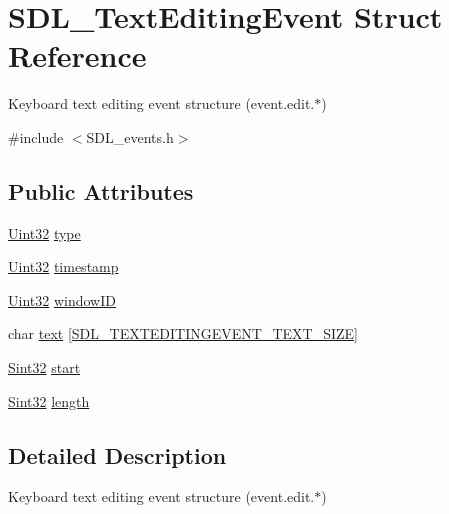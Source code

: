 \hypertarget{struct_s_d_l___text_editing_event}{\section{S\-D\-L\-\_\-\-Text\-Editing\-Event Struct Reference}
\label{struct_s_d_l___text_editing_event}
}


Keyboard text editing event structure (event.\-edit.$\ast$)  




{\ttfamily \#include $<$S\-D\-L\-\_\-events.\-h$>$}

\subsection*{Public Attributes}
\begin{DoxyCompactItemize}
\item 
\hyperlink{_s_d_l__stdinc_8h_add440eff171ea5f55cb00c4a9ab8672d}{Uint32} \hyperlink{struct_s_d_l___text_editing_event_a198e6df194a3bf12cf5f82553e84c7cb}{type}
\item 
\hyperlink{_s_d_l__stdinc_8h_add440eff171ea5f55cb00c4a9ab8672d}{Uint32} \hyperlink{struct_s_d_l___text_editing_event_afc164f40abee6fd8e72e01b589210c75}{timestamp}
\item 
\hyperlink{_s_d_l__stdinc_8h_add440eff171ea5f55cb00c4a9ab8672d}{Uint32} \hyperlink{struct_s_d_l___text_editing_event_a23b3e414cf7a7ccc547b7595ca930049}{window\-I\-D}
\item 
char \hyperlink{struct_s_d_l___text_editing_event_a29848c2e7819ea98ae8fb08543e6d420}{text} \mbox{[}\hyperlink{_s_d_l__events_8h_a2399de7b94f0570b853f5da9c5db7e82}{S\-D\-L\-\_\-\-T\-E\-X\-T\-E\-D\-I\-T\-I\-N\-G\-E\-V\-E\-N\-T\-\_\-\-T\-E\-X\-T\-\_\-\-S\-I\-Z\-E}\mbox{]}
\item 
\hyperlink{_s_d_l__stdinc_8h_a7a90b941db9d4582e9ad7abb9940ff7e}{Sint32} \hyperlink{struct_s_d_l___text_editing_event_ac6c6a00835d92b12c0ba5b78b5ad676d}{start}
\item 
\hyperlink{_s_d_l__stdinc_8h_a7a90b941db9d4582e9ad7abb9940ff7e}{Sint32} \hyperlink{struct_s_d_l___text_editing_event_adca95505c0bf212834930df58f6d1aa5}{length}
\end{DoxyCompactItemize}


\subsection{Detailed Description}
Keyboard text editing event structure (event.\-edit.$\ast$) 

